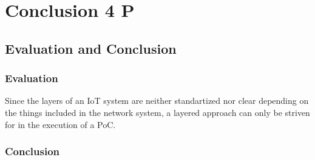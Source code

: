 
\chapter{Conclusion 4 P} %

\label{Chapter5} %

\section{Evaluation and Conclusion}
\subsection{Evaluation}
Since the layers of an IoT system are neither standartized nor clear depending on the things included in the network system, a layered approach can only be striven for in the execution of a PoC. 
\subsection{Conclusion}
